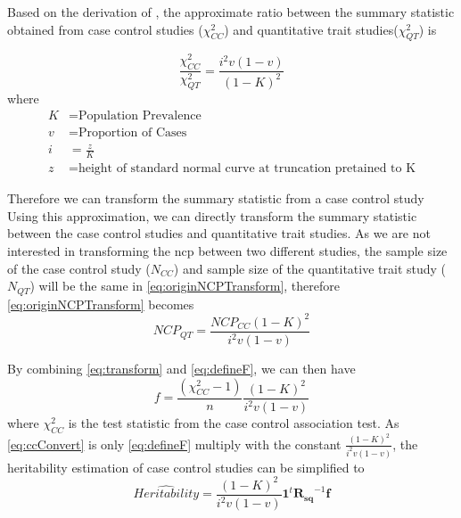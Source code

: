 			Based on the derivation of \citet{Yang2010}, the approximate ratio between the summary statistic obtained from case control studies ($\chi^2_{CC}$) and quantitative trait studies($\chi^2_{QT}$) is
		
			\begin{equation}
			\frac{\chi^2_{CC}}{\chi^2_{QT}} = \frac{i^2v(1-v)}{(1-K)^2}
			\label{eq:originNCPTransform}
			\end{equation}
			where
			\begin{align*}
			 K &= \text{Population Prevalence} \\
			 v &= \text{Proportion of Cases}\\
			 i &= \frac{z}{K}\\
			 z &= \text{height of standard normal curve at truncation pretained to K}
			\end{align*}
			
			Therefore we can transform the summary statistic from a case control study 
			Using this approximation, we can directly transform the summary statistic between the case control studies and quantitative trait studies.
			As we are not interested in transforming the \gls{ncp} between two different studies, the sample size of the case control study ($N_{CC}$) and sample size of the quantitative trait study ($N_{QT}$) will be the same in \cref{eq:originNCPTransform}, therefore \cref{eq:originNCPTransform} becomes
			\begin{equation}
			NCP_{QT} = \frac{NCP_{CC}(1-K)^2}{i^2v(1-v)}
			\label{eq:transform}
			\end{equation}
			
			By combining \cref{eq:transform} and \cref{eq:defineF}, we can then have
			\begin{equation}
			f = \frac{(\chi^2_{CC}-1)}{n}\frac{(1-K)^2}{i^2v(1-v)}
			\label{eq:ccConvert}
			\end{equation}
			where $\chi^2_{CC}$ is the test statistic from the case control association test.
			As \cref{eq:ccConvert} is only \cref{eq:defineF} multiply with the constant $\frac{(1-K)^2}{i^2v(1-v)}$, the heritability estimation of case control studies can be simplified to 
			\begin{equation}
			\hat{Heritability} =\frac{(1-K)^2}{i^2v(1-v)} \boldsymbol{1}^t\boldsymbol{R_{sq}}^{-1}\boldsymbol{f}
			\label{eq:caseControlHerit}
			\end{equation}
			
